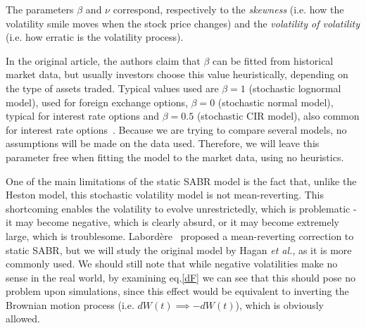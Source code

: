 The parameters $\beta$ and $\nu$ correspond, respectively to the \emph{skewness} (i.e. how the volatility smile moves when the stock price changes) and the \emph{volatility of volatility} (i.e. how erratic is the volatility process).



In the original article, the authors claim that $\beta$ can be fitted from historical market data, but usually investors choose this value heuristically, depending on the type of assets traded. Typical values used are $\beta=1$ (stochastic lognormal model), used for foreign exchange options, $\beta=0$ (stochastic normal model), typical for interest rate options and $\beta=0.5$ (stochastic CIR model), also common for interest rate options~\citep{Hagan}.
Because we are trying to compare several models, no assumptions will be made on the data used. Therefore, we will leave this parameter free when fitting the model to the market data, using no heuristics.

One of the main limitations of the static SABR model is the fact that, unlike the Heston model, this stochastic volatility model is not mean-reverting. This shortcoming enables the volatility to evolve unrestrictedly, which is problematic - it may become negative, which is clearly absurd, or it may become extremely large, which is troublesome. Labordère~\citep{Labordere} proposed a mean-reverting correction to static SABR, but we will study the original model by Hagan \textit{et al.}, as it is more commonly used. We should still note that while negative volatilities make no sense in the real world, by examining eq.\eqref{dF} we can see that this should pose no problem upon simulations, since this effect would be equivalent to inverting the Brownian motion process (i.e. $dW(t)\implies-dW(t)$), which is obviously allowed.

